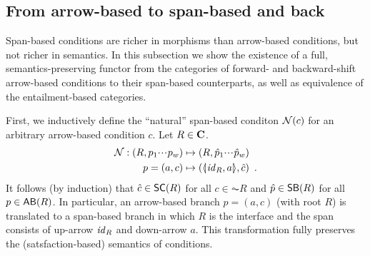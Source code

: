 \subsection{From arrow-based to span-based and back}

Span-based conditions are richer in morphisms than arrow-based conditions, but not richer in semantics. In this subsection we show the existence of a full, semantics-preserving functor from the categories of forward- and backward-shift arrow-based conditions to their span-based counterparts, as well as equivalence of the entailment-based categories.

First, we inductively define the ``natural'' span-based conditon $\mathcal{N}(c)$ for an arbitrary arrow-based condition $c$. Let $R\in\mathbf{C}$.
\begin{align*}
\cN: (R,p_1\ccdots p_w) & \mapsto (R,\hat p_1\ccdots \hat p_w) \\
      p=(a,c) & \mapsto (\spanof{\id_R}{a},\hat c) \enspace.
\end{align*}
%
It follows (by induction) that $\hat c\in \SC R$ for all $c\in \AC R$ and $\hat p\in \SB R$ for all $p\in \AB R$. In particular, an arrow-based branch $p=(a,c)$ (with root $R$) is translated to a span-based branch in which $R$ is the interface and the span consists of up-arrow $\mathit{id}_R$ and down-arrow $a$. This transformation fully preserves the (satsfaction-based) semantics of conditions.

